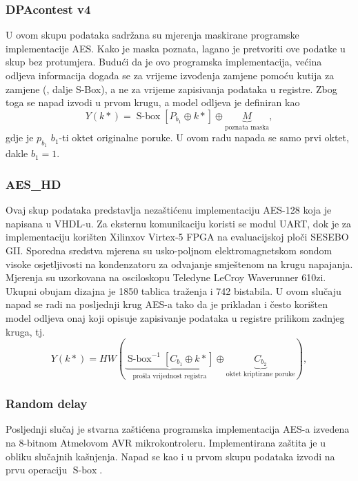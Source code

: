 \documentclass[times, utf8, diplomski]{fer}
\newcommand\aessbox{\operatorname{S-box}}   %
\begin{document}
\subsubsection{DPAcontest v4}
U ovom skupu podataka sadržana su mjerenja maskirane programske implementacije AES. Kako je maska poznata, lagano je pretvoriti ove podatke u skup bez protumjera. Budući da je ovo programska implementacija, većina odljeva informacija događa se za vrijeme izvođenja zamjene pomoću kutija za zamjene (, dalje S-Box), a ne za vrijeme zapisivanja podataka u registre. Zbog toga se napad izvodi u prvom krugu, a model odljeva je definiran kao
\begin{equation}
    Y(k*) = \aessbox{}\left[ P_{b_1} \oplus k* \right] \oplus \underbrace{M}_\text{poznata maska},
\end{equation}
gdje je $p_{b_1}$ $b_1$-ti oktet originalne poruke. U ovom radu napada se samo prvi oktet, dakle $b_1 = 1$.


\subsubsection{AES\_HD} Ovaj skup podataka predstavlja nezaštićenu implementaciju AES-128 koja je napisana u VHDL-u. Za eksternu komunikaciju koristi se modul UART, dok je za implementaciju korišten Xilinxov Virtex-5 FPGA na evaluacijskoj ploči SESEBO GII. Sporedna sredstva mjerena su usko-poljnom elektromagnetskom sondom visoke osjetljivosti na kondenzatoru za odvajanje smještenom na krugu napajanja. Mjerenja su uzorkovana na osciloskopu Teledyne LeCroy Waverunner 610zi. Ukupni obujam dizajna je 1850 tablica traženja  i 742 bistabila. U ovom slučaju napad se radi na posljednji krug AES-a tako da je prikladan i često korišten model odljeva onaj koji opisuje zapisivanje podataka u registre prilikom zadnjeg kruga, tj.
\begin{equation}
    Y(k*) = HW(\underbrace{\aessbox^{-1} \left[ C_{b_1} \oplus k* \right]}_\text{prošla vrijednost registra} \oplus \underbrace{C_{b_2}}_\text{oktet kriptirane poruke}),
\end{equation}

\subsubsection{Random delay}
Posljednji slučaj je stvarna zaštićena programska implementacija AES-a izvedena na 8-bitnom Atmelovom AVR mikrokontroleru. Implementirana zaštita je u obliku slučajnih kašnjenja. Napad se kao i u prvom skupu podataka izvodi na prvu operaciju $\aessbox$.
\end{document}
